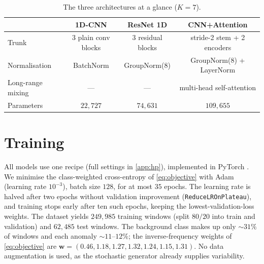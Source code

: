 \begin{table}[H]
    \centering \footnotesize
    \begin{tabular}{lccc}
        \toprule
        & \textbf{1D-CNN} & \textbf{ResNet 1D} & \textbf{CNN+Attention} \\
        \midrule
        Trunk            & 3 plain conv blocks & 3 residual blocks & stride-2 stem + 2 encoders \\
        Normalisation    & BatchNorm           & GroupNorm(8)      & GroupNorm(8) + LayerNorm \\
        Long-range mixing& ---                 & ---               & multi-head self-attention \\
        Parameters       & $22{,}727$          & $74{,}631$        & $109{,}655$ \\
        \bottomrule
    \end{tabular}
    \caption{The three architectures at a glance ($K=7$).}
    \label{tab:arch-compare}
\end{table}

\section{Training}
\label{sec:training}

All models use one recipe (full settings in \cref{app:hp}), implemented in
PyTorch \cite{paszke2019pytorch}. We minimise the class-weighted cross-entropy of
\cref{eq:objective} with Adam \cite{kingma2015adam} (learning rate $10^{-3}$),
batch size $128$, for at most $35$ epochs. The learning rate is halved after two
epochs without validation improvement (\texttt{ReduceLROnPlateau}), and training
stops early after ten such epochs, keeping the lowest-validation-loss weights.
The dataset yields $249{,}985$ training windows (split $80/20$ into train and
validation) and $62{,}485$ test windows. The background class makes up only
$\sim 31\%$ of windows and each anomaly $\sim 11$--$12\%$; the inverse-frequency
weights of \cref{eq:objective} are
$\mathbf{w}=(0.46,1.18,1.27,1.32,1.24,1.15,1.31)$. No data augmentation is used,
as the stochastic generator already supplies variability.
